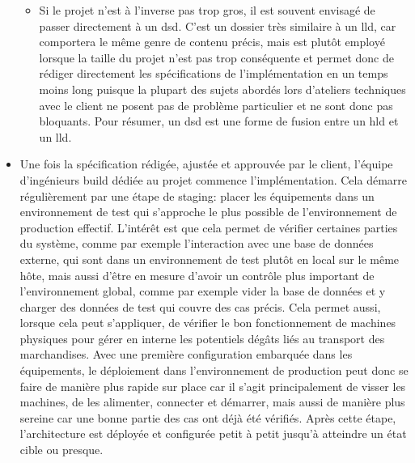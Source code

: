 \documentclass[12pt, oneside, a4paper, titlepage]{report}
\begin{document}
\begin{itemize}
\begin{itemize}
        \item Si le projet n'est à l'inverse pas trop gros, il est souvent
            envisagé de passer directement à un \gls{dsd}. C'est un dossier très
            similaire à un \gls{lld}, car comportera le même genre de contenu
            précis, mais est plutôt employé lorsque la taille du projet n'est
            pas trop conséquente et permet donc de rédiger directement les
            spécifications de l'implémentation en un temps moins long puisque la
            plupart des sujets abordés lors d'ateliers techniques avec le client
            ne posent pas de problème particulier et ne sont donc pas bloquants.
            Pour résumer, un \gls{dsd} est une forme de fusion entre un
            \gls{hld} et un \gls{lld}.

    \end{itemize}

    \item Une fois la spécification rédigée, ajustée et approuvée par le client,
        l'équipe d'ingénieurs \gls{build} dédiée au projet commence
        l'implémentation. Cela démarre régulièrement par une étape de
        \gls{staging}: placer les équipements dans un environnement de test qui
        s'approche le plus possible de l'environnement de production effectif.
        L'intérêt est que cela permet de vérifier certaines parties du système,
        comme par exemple l'interaction avec une base de données externe, qui
        sont dans un environnement de test plutôt en local sur le même hôte,
        mais aussi d'être en mesure d'avoir un contrôle plus important de
        l'environnement global, comme par exemple vider la base de données et y
        charger des données de test qui couvre des cas précis. Cela permet
        aussi, lorsque cela peut s'appliquer, de vérifier le bon fonctionnement
        de machines physiques pour gérer en interne les potentiels dégâts liés
        au transport des marchandises. Avec une première configuration embarquée
        dans les équipements, le déploiement dans l'environnement de production
        peut donc se faire de manière plus rapide sur place car il s'agit
        principalement de visser les machines, de les alimenter, connecter et
        démarrer, mais aussi de manière plus sereine car une bonne partie des
        cas ont déjà été vérifiés. Après cette étape, l'architecture est
        déployée et configurée petit à petit jusqu'à atteindre un état cible ou
        presque.


\end{itemize}
\end{document}
